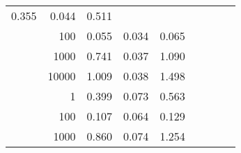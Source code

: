 \begin{table}
\begin{tabular}{rrrrrrrrr}
						
							    
							    
	                           0.355 & 0.044 & 0.511  \\
	                
	            
					 &  
					 
					\multirow{ 1 }{*}{ 100 } &
					
						
							    
							    
	                           0.055 & 0.034 & 0.065  \\
	                
	            
					 &  
					 
					\multirow{ 1 }{*}{ 1000 } &
					
						
							    
							    
	                           0.741 & 0.037 & 1.090  \\
	                
	            
					 &  
					 
					\multirow{ 1 }{*}{ 10000 } &
					
						
							    
							    
	                           1.009 & 0.038 & 1.498  \\
	                
	            
	        
				\noalign{\smallskip}\hline
				\multirow{ 4 }{*}{ 1000000 } &
				
					
					 
					\multirow{ 1 }{*}{ 1 } &
					
						
							    
							    
	                           0.399 & 0.073 & 0.563  \\
	                
	            
					 &  
					 
					\multirow{ 1 }{*}{ 100 } &
					
						
							    
							    
	                           0.107 & 0.064 & 0.129  \\
	                
	            
					 &  
					 
					\multirow{ 1 }{*}{ 1000 } &
					
						
							    
							    
	                           0.860 & 0.074 & 1.254  \\
	                

\end{tabular}
\end{table}

